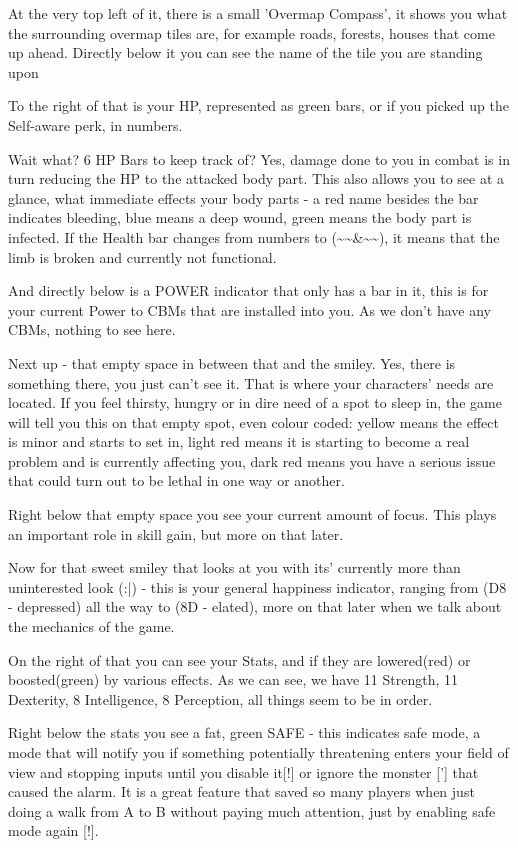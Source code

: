 At the very top left of it, there is a small 'Overmap Compass', it shows you what the surrounding overmap tiles are, for example roads, forests, houses that come up ahead. Directly below it you can see the name of the tile you are standing upon

To the right of that is your HP, represented as green bars, or if you picked up the Self-aware perk, in numbers.

Wait what? 6 HP Bars to keep track of? Yes, damage done to you in combat is in turn reducing the HP to the attacked body part. This also allows you to see at a glance, what immediate effects your body parts - a red name besides the bar indicates bleeding, blue means a deep wound, green means the body part is infected. If the Health bar changes from numbers to (\~{}\~{}\&\~{}\~{}), it means that the limb is broken and currently not functional.

And directly below is a POWER indicator that only has a bar in it, this is for your current Power to CBMs that are installed into you. As we don't have any CBMs, nothing to see here.

Next up - that empty space in between that and the smiley. Yes, there is something there, you just can't see it. That is where your characters' needs are located. If you feel thirsty, hungry or in dire need of a spot to sleep in, the game will tell you this on that empty spot, even colour coded: yellow means the effect is minor and starts to set in, light red means it is starting to become a real problem and is currently affecting you, dark red means you have a serious issue that could turn out to be lethal in one way or another.

Right below that empty space you see your current amount of focus. This plays an important role in skill gain, but more on that later.

Now for that sweet smiley that looks at you with its' currently more than uninterested look (:|) - this is your general happiness indicator, ranging from (D8 - depressed) all the way to (8D - elated), more on that later when we talk about the mechanics of the game.

On the right of that you can see your Stats, and if they are lowered(red) or boosted(green) by various effects. As we can see, we have 11 Strength, 11 Dexterity, 8 Intelligence, 8 Perception, all things seem to be in order.

Right below the stats you see a fat, green SAFE - this indicates safe mode, a mode that will notify you if something potentially threatening enters your field of view and stopping inputs until you disable it[!] or ignore the monster ['] that caused the alarm. It is a great feature that saved so many players when just doing a walk from A to B without paying much attention, just by enabling safe mode again [!].

